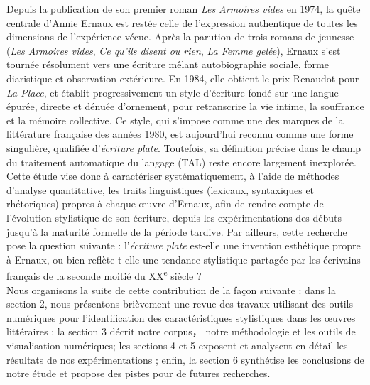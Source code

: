 Depuis la publication de son premier roman \textit{Les Armoires vides} en 1974, la quête centrale d’Annie Ernaux est restée celle de l’expression authentique de toutes les dimensions de l’expérience vécue. Après la parution de trois romans de jeunesse (\textit{Les Armoires vides}, \textit{Ce qu’ils disent ou rien}, \textit{La Femme gelée}), Ernaux s’est tournée résolument vers une écriture mêlant autobiographie sociale, forme diaristique et observation extérieure. En 1984, elle obtient le prix Renaudot pour \textit{La Place}, et établit progressivement un style d’écriture fondé sur une langue épurée, directe et dénuée d’ornement, pour retranscrire la vie intime, la souffrance et la mémoire collective. Ce style, qui s’impose comme une des marques de la littérature française des années 1980, est aujourd’hui reconnu comme une forme singulière, qualifiée d’\textit{écriture plate}. Toutefois, sa définition précise dans le champ du traitement automatique du langage (TAL) reste encore largement inexplorée.\\

Cette étude vise donc à caractériser systématiquement, à l’aide de méthodes d’analyse quantitative, les traits linguistiques (lexicaux, syntaxiques et rhétoriques) propres à chaque œuvre d’Ernaux, afin de rendre compte de l’évolution stylistique de son écriture, depuis les expérimentations des débuts jusqu’à la maturité formelle de la période tardive. Par ailleurs, cette recherche pose la question suivante : l’\textit{écriture plate} est-elle une invention esthétique propre à Ernaux, ou bien reflète-t-elle une tendance stylistique partagée par les écrivains français de la seconde moitié du XX\textsuperscript{e} siècle ? \\

Nous organisons la suite de cette contribution de la façon suivante : dans la section 2, nous présentons brièvement une revue des travaux utilisant des outils numériques pour l’identification des caractéristiques stylistiques dans les œuvres littéraires ; la section 3 décrit notre corpus， notre méthodologie et les outils de visualisation numériques; les sections 4 et 5 exposent et analysent en détail les résultats de nos expérimentations ; enfin, la section 6 synthétise les conclusions de notre étude et propose des pistes pour de futures recherches.
